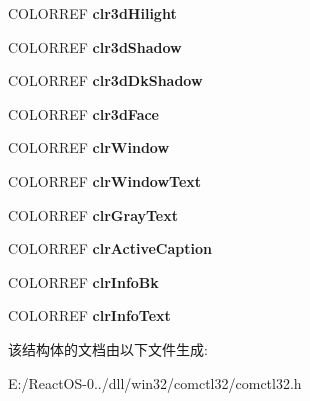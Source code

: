 \begin{DoxyCompactItemize}
C\+O\+L\+O\+R\+R\+EF {\bfseries clr3d\+Hilight}
\item 
\mbox{\label{struct_c_o_m_c_t_l32___sys_color_a7fe8446625de1456236ce76092a9d763}} 
C\+O\+L\+O\+R\+R\+EF {\bfseries clr3d\+Shadow}
\item 
\mbox{\label{struct_c_o_m_c_t_l32___sys_color_aa473a49f9e7d2b65def4a8652bedec51}} 
C\+O\+L\+O\+R\+R\+EF {\bfseries clr3d\+Dk\+Shadow}
\item 
\mbox{\label{struct_c_o_m_c_t_l32___sys_color_a595d9f56c2deb6cb0f18b352f8f8e7f2}} 
C\+O\+L\+O\+R\+R\+EF {\bfseries clr3d\+Face}
\item 
\mbox{\label{struct_c_o_m_c_t_l32___sys_color_a3724ccfd7d8f02e6f50a0f84e098998e}} 
C\+O\+L\+O\+R\+R\+EF {\bfseries clr\+Window}
\item 
\mbox{\label{struct_c_o_m_c_t_l32___sys_color_ad149a8e4ccfdd8f6678856f74a63dc4a}} 
C\+O\+L\+O\+R\+R\+EF {\bfseries clr\+Window\+Text}
\item 
\mbox{\label{struct_c_o_m_c_t_l32___sys_color_a9a6e2e9c7d5d5e2810b63e8ac5cdf6d5}} 
C\+O\+L\+O\+R\+R\+EF {\bfseries clr\+Gray\+Text}
\item 
\mbox{\label{struct_c_o_m_c_t_l32___sys_color_a6e01b65e6921deb0dda29d1c64a0d0f7}} 
C\+O\+L\+O\+R\+R\+EF {\bfseries clr\+Active\+Caption}
\item 
\mbox{\label{struct_c_o_m_c_t_l32___sys_color_abec693fd92e32188fa8806f3281e6358}} 
C\+O\+L\+O\+R\+R\+EF {\bfseries clr\+Info\+Bk}
\item 
\mbox{\label{struct_c_o_m_c_t_l32___sys_color_a2d1feb3b693dd14c7906e810b70b7a95}} 
C\+O\+L\+O\+R\+R\+EF {\bfseries clr\+Info\+Text}
\end{DoxyCompactItemize}


该结构体的文档由以下文件生成\+:\begin{DoxyCompactItemize}
\item 
E\+:/\+React\+O\+S-\/0../dll/win32/comctl32/comctl32.\+h\end{DoxyCompactItemize}
